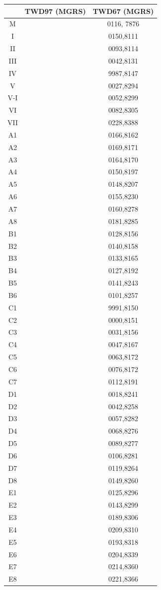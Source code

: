 \documentclass[12pt,landscape]{article}
\begin{document}
\begin{multicols}{2}
\begin{tabular}{|c|c|c|}
	\hline
	& TWD97 (MGRS)& TWD67 (MGRS)\\  
	\hline
	M & & 0116, 7876\\ 
	\hline
	I & & 0150,8111\\
	II & & 0093,8114\\
	III & & 0042,8131\\
	IV & & 9987,8147\\
	V & & 0027,8294\\
	V-I & & 0052,8299\\
	VI & & 0082,8305\\
	VII & & 0228,8388\\
	\hline
	A1 & & 0166,8162\\
	A2 & & 0169,8171\\
	A3 & & 0164,8170\\
	A4 & & 0150,8197\\
	A5 & & 0148,8207\\
	A6 & & 0155,8230\\
	A7 & & 0160,8278\\
	A8 & & 0181,8285\\
	\hline
	B1 & & 0128,8156\\
	B2 & & 0140,8158\\
	B3 & & 0133,8165\\
	B4 & & 0127,8192\\
	B5 & & 0141,8243\\
	B6 & & 0101,8257\\
	\hline
	C1 & & 9991,8150\\
	C2 & & 0000,8151\\
	C3 & & 0031,8156\\
	C4 & & 0047,8167\\
	C5 & & 0063,8172\\
	C6 & & 0076,8172\\
	C7 & & 0112,8191\\
	\hline
	D1 & & 0018,8241\\
	D2 & & 0042,8258\\
	D3 & & 0057,8282\\
	D4 & & 0068,8276\\
	D5 & & 0089,8277\\
	D6 & & 0106,8281\\
	D7 & & 0119,8264\\
	D8 & & 0149,8260\\
	\hline
	E1 & & 0125,8296\\
	E2 & & 0143,8299\\
	E3 & & 0189,8306\\
	E4 & & 0209,8310\\
	E5 & & 0193,8318\\
	E6 & & 0204,8339\\
	E7 & & 0214,8360\\
	E8 & & 0221,8366\\
	\hline
\end{tabular}

\end{multicols}
\end{document}
